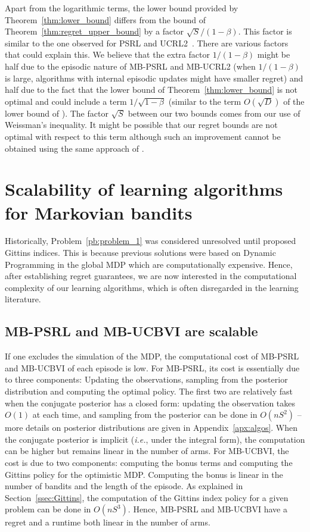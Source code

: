 Apart from the logarithmic terms, the lower bound provided by Theorem~\ref{thm:lower_bound} differs from the bound of Theorem~\ref{thm:regret_upper_bound} by a factor $\sqrt{S}/(1-\beta)$. This factor is similar to the one observed for PSRL and UCRL2~\cite{osband2013more,jaksch2010near}. There are various factors that could explain this. We believe that the extra factor  $1/(1-\beta)$ might be half due to the episodic nature of MB-PSRL and MB-UCRL2 (when $1/(1-\beta)$ is large, algorithms with internal episodic updates might have smaller regret) and half due to the fact that the lower bound of Theorem~\ref{thm:lower_bound} is not optimal and could include a term $1/\sqrt{1-\beta}$ (similar to the term $O(\sqrt{D})$ of the lower bound of \cite{osband2016lower,jaksch2010near}). The factor $\sqrt{S}$ between our two bounds comes from our use of Weissman's inequality. It might be possible that our regret bounds  are not optimal with respect to this term although such an improvement cannot be obtained using the same approach of \cite{azar2017minimax}.

\section{Scalability of learning algorithms for Markovian bandits}

Historically, Problem~{\ref{pb:problem_1}} was considered unresolved until \cite{gittins1979bandit} proposed Gittins indices. This is because previous solutions were based on Dynamic Programming in the global MDP which are computationally expensive. Hence, after establishing regret guarantees, we are now interested in the computational complexity of our learning algorithms, which is often disregarded in the learning literature.

\subsection{MB-PSRL and MB-UCBVI are scalable}
\label{sec:OFU}

If one excludes the simulation of the MDP, the computational cost of MB-PSRL and MB-UCBVI of each episode is low. For MB-PSRL, its cost is essentially due to three components: Updating the observations, sampling from the posterior distribution and computing the optimal policy. The first two are relatively fast when the conjugate posterior has a closed form: updating the observation takes $O(1)$ at each time, and sampling from the posterior can be done in $O(nS^2)$ -- more details on posterior distributions are given in Appendix~\ref{apx:algos}. When the conjugate posterior is implicit (\emph{i.e.}, under the integral form), the computation can be higher but remains linear in the number of arms. For MB-UCBVI, the cost is due to two components: computing the bonus terms and computing the Gittins policy for the optimistic MDP. Computing the bonus is linear in the number of bandits and the length of the episode. As explained in Section~\ref{ssec:Gittins}, the computation of the Gittins index policy for a given problem can be done in $O(nS^3)$. Hence, MB-PSRL and MB-UCBVI have a regret and a runtime both linear in the number of arms.

